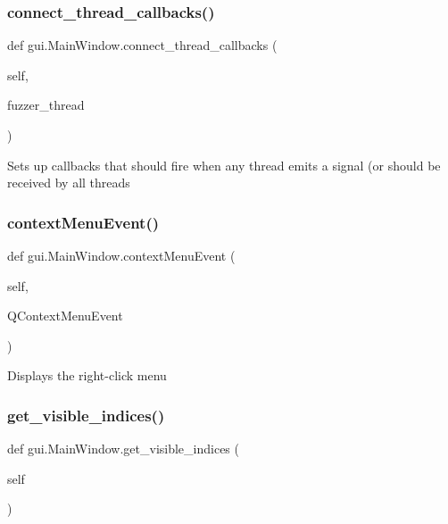 \subsubsection{\texorpdfstring{connect\+\_\+thread\+\_\+callbacks()}{connect\_thread\_callbacks()}}
{\footnotesize\ttfamily def gui.\+Main\+Window.\+connect\+\_\+thread\+\_\+callbacks (\begin{DoxyParamCaption}\item[{}]{self,  }\item[{}]{fuzzer\+\_\+thread }\end{DoxyParamCaption})}

\begin{DoxyVerb}Sets up callbacks that should fire when any thread emits a signal (or should be received by all threads \end{DoxyVerb}
 \mbox{\label{classgui_1_1_main_window_a022a75eb1bdcbe6bb78a5a320bf72493}} 
\subsubsection{\texorpdfstring{context\+Menu\+Event()}{contextMenuEvent()}}
{\footnotesize\ttfamily def gui.\+Main\+Window.\+context\+Menu\+Event (\begin{DoxyParamCaption}\item[{}]{self,  }\item[{}]{Q\+Context\+Menu\+Event }\end{DoxyParamCaption})}

\begin{DoxyVerb}Displays the right-click menu \end{DoxyVerb}
 \mbox{\label{classgui_1_1_main_window_ac66feba1a2f8562a9e919bf2e9a7fdc1}} 
\subsubsection{\texorpdfstring{get\+\_\+visible\+\_\+indices()}{get\_visible\_indices()}}
{\footnotesize\ttfamily def gui.\+Main\+Window.\+get\+\_\+visible\+\_\+indices (\begin{DoxyParamCaption}\item[{}]{self }\end{DoxyParamCaption})}

